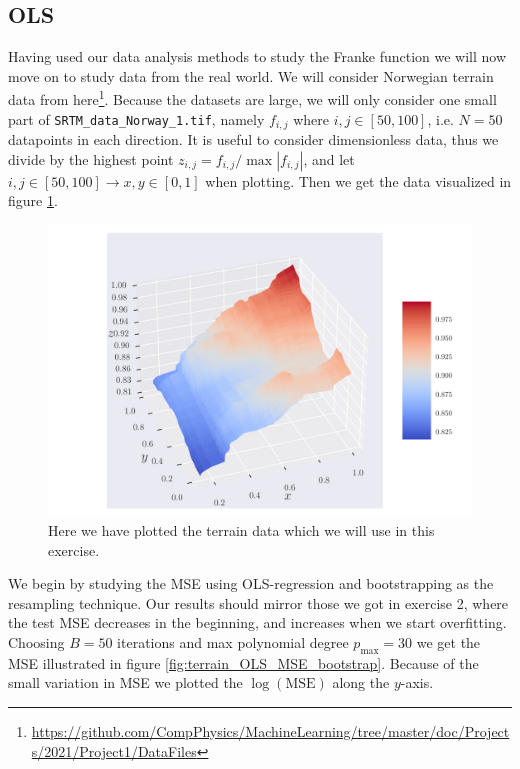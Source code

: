 \documentclass[reprint,english,notitlepage,aps,nobalancelastpage,nofootinbib]{revtex4-1}  %
\begin{document}
\subsection*{OLS}
Having used our data analysis methods to study the Franke function we will now move on to study data from the real world. We will consider Norwegian terrain data from here\footnote{\href{https://github.com/CompPhysics/MachineLearning/tree/master/doc/Projects/2021/Project1/DataFiles}{https://github.com/CompPhysics/MachineLearning/tree/master/doc/Projects/2021/Project1/DataFiles}}. Because the datasets are large, we will only consider one small part of \texttt{SRTM\_data\_Norway\_1.tif}, namely $f_{i,j}$ where $i,j\in[50,100]$, i.e. $N=50$ datapoints in each direction. It is useful to consider dimensionless data, thus we divide by the highest point $z_{i,j} = f_{i,j}/\max{|f_{i,j}|}$, and let $i,j\in[50,100] \rightarrow x,y\in[0,1]$ when plotting. Then we get the data visualized in figure \ref{fig:terrain_raw}.

\begin{figure}[h]
  \includegraphics[width=\linewidth]{SRTM_rawdata_n50.pdf}
  \caption{Here we have plotted the terrain data which we will use in this exercise.}
  \label{fig:terrain_raw}
\end{figure}

We begin by studying the MSE using OLS-regression and bootstrapping as the resampling technique. Our results should mirror those we got in exercise 2, where the test MSE decreases in the beginning, and increases when we start overfitting. Choosing $B = 50$ iterations and max polynomial degree $p_\text{max} = 30$ we get the MSE illustrated in figure \ref{fig:terrain_OLS_MSE_bootstrap}. Because of the small variation in MSE we plotted the $\log(\text{MSE})$ along the $y$-axis.
\end{document}

